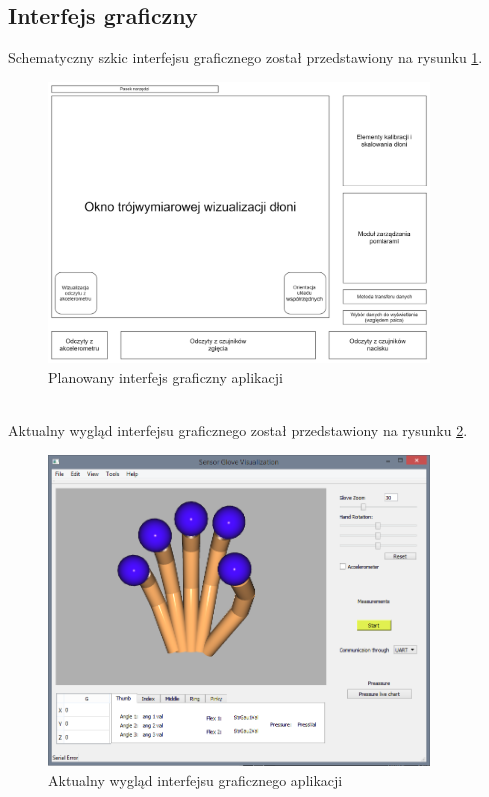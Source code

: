 \documentclass[10pt,a4paper]{article}
\begin{document}
\newpage
\subsection{Interfejs graficzny}
Schematyczny szkic interfejsu graficznego został przedstawiony na rysunku \ref{fig:interface}.
\begin{figure}[!htb]
\centering
\includegraphics[width=0.9\textwidth]{./WDS_schemat_ideowy_okna_programu.png}
\caption{Planowany interfejs graficzny aplikacji\label{fig:interface}}
\end{figure}\\
Aktualny wygląd interfejsu graficznego został przedstawiony na rysunku \ref{fig:currentInt}.
\begin{figure}[!htb]
\centering
\includegraphics[width=0.9\textwidth]{./AktualnyInterfejsGraficzny.png}
\caption{Aktualny wygląd interfejsu graficznego aplikacji\label{fig:currentInt}}
\end{figure}
\end{document}
